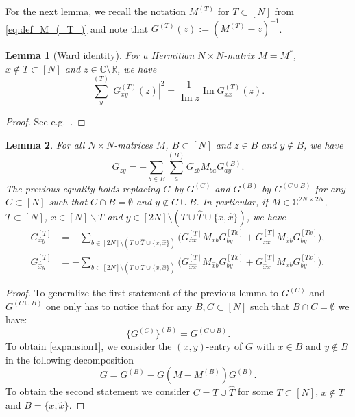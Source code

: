 \documentclass[10pt,a4paper]{amsart}
\DeclareMathOperator{\Ima}{Im}
\newcommand{\R}{\mathbb{R}}
\newcommand{\C}{\mathbb{C}}
\newtheorem{lemma}{Lemma}[section]
\numberwithin{equation}{section}
\newcommand*\bset[1]{[#1]}
\newcommand*\ubarr[1]{{\widehat{#1}}}
\begin{document}
	For the next lemma, we recall the notation $M^{(T)}$ for $T \subset [N]$ from \cref{eq:def_M_(_T_)} and note that $G^{(T)}(z):= (M^{(T)} - z)^{-1}$. 
	\begin{lemma}[Ward identity]\label{lemma:wardidentity}
		For a Hermitian $N \times N$-matrix $M=M^*$, $x \notin T \subset [N]$ and $z \in \C \setminus \R$, we have
		\begin{equation}\label{eq:wardidentity}
			\sum_{y}^{(T)} |G_{xy}^{(T)}(z)|^2 = \frac{1}{\Ima z}\Ima G_{xx}^{(T)} (z).
		\end{equation}
	\end{lemma}
	
	\begin{proof}
		See e.g.\ \cite[Equation (3.6)]{benaych2016lectures}.
	\end{proof}
	\begin{lemma}
		For all $N\times N$-matrices $M$, $B \subset [N]$ and $z \in B $ and $y \notin B$, we have
		\begin{equation}\label{expansion1}
			G_{zy} = - \sum_{b \in B} \sum_{a}^{(B)} G_{zb} M_{ba} G_{ay}^{(B)}.
		\end{equation}
		The previous equality holds replacing $G$ by $G^{(C)}$ and $G^{(B)}$ by $G^{(C \cup B)}$ for any $C\subset [N]$ such that $C \cap B = \emptyset$ and $y \notin C \cup B$. In particular, if $M \in \C^{2N \times 2N}$, $T \subset [N]$, $x \in [N]\backslash T$ and $y\in [2N]\setminus (T \cup \ubarr{T} \cup \{ x, \ubarr{x}\})$,  we have
		\begin{align}
		G^{\bset{T}}_{xy} &= - \sum_{b \in [2N]\setminus (T \cup \ubarr{T} \cup \{ x, \ubarr{x}\})}  \Big( G_{xx}^{\bset{T}} M_{xb} G^{\bset{Tx}}_{by} + G^{\bset{T}}_{x \ubarr{x}}  M_{\ubarr{x} b} G^{\bset{Tx}}_{by} \Big), \label{eq:A29A}\\ 
			G^{\bset{T}}_{\ubarr{x}y} &= - \sum_{b \in [2N]\setminus (T \cup \ubarr{T} \cup \{ x, \ubarr{x}\})}  \Big( G_{\ubarr{x}\ubarr{x}}^{\bset{T}} M_{\ubarr{x}b} G^{\bset{Tx}}_{by} + G^{\bset{T}}_{\ubarr{x}x }  M_{x b} G^{\bset{Tx}}_{by} \Big). \label{eq:A29B}
		\end{align}
	\end{lemma}
	\begin{proof}
		To generalize the first statement of the previous lemma to $G^{(C)}$ and $G^{(C\cup B)}$ one only has to notice that for any $B,C \subset [N]$ such that $B \cap C = \emptyset$ we have:
		$$\{G^{(C)}\}^{(B)}= G^{(C\cup B)}.$$
		To obtain \eqref{expansion1}, we consider the $(x,y)$-entry of $G$ with $x \in B$ and $y \notin B$ in the following decomposition
		\begin{equation}\label{eq:resolv_identity}
			G= G^{(B)} - G \left(M - M^{(B)}\right) G^{(B)}.
		\end{equation}
		To obtain the second statement we consider  $C = T \cup \ubarr{T}$ for some $T \subset [N] $, $x \notin T$ and $B = \{x, \ubarr{x}\}$.
	\end{proof}
\end{document}
